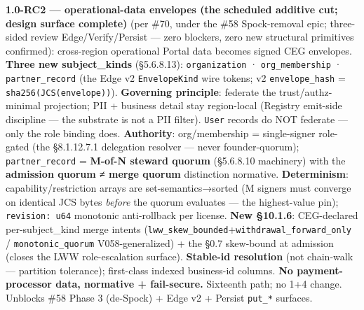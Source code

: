 \documentclass[11pt]{article}
\begin{document}
\textbf{1.0-RC2 — operational-data envelopes (the scheduled additive cut; design surface complete)} (per \#70, under the \#58 Spock-removal epic; three-sided review Edge/Verify/Persist — zero blockers, zero new structural primitives confirmed): cross-region operational Portal data becomes signed CEG envelopes. \textbf{Three new subject\_kinds} (§5.6.8.13): \texttt{organization} · \texttt{org\_membership} · \texttt{partner\_record} (the Edge v2 \texttt{EnvelopeKind} wire tokens; v2 \texttt{envelope\_hash} = \texttt{sha256(JCS(envelope))}). \textbf{Governing principle}: federate the trust/authz-minimal projection; PII + business detail stay region-local (Registry emit-side discipline — the substrate is not a PII filter). \texttt{User} records do NOT federate — only the role binding does. \textbf{Authority}: org/membership = single-signer role-gated (the §8.1.12.7.1 delegation resolver — never founder-quorum); \texttt{partner\_record} = \textbf{M-of-N steward quorum} (§5.6.8.10 machinery) with the \textbf{admission quorum ≠ merge quorum} distinction normative. \textbf{Determinism}: capability/restriction arrays are set-semantics→sorted (M signers must converge on identical JCS bytes \textit{before} the quorum evaluates — the highest-value pin); \texttt{revision: u64} monotonic anti-rollback per license. \textbf{New §10.1.6}: CEG-declared per-subject\_kind merge intents (\texttt{lww\_skew\_bounded}+\texttt{withdrawal\_forward\_only} / \texttt{monotonic\_quorum} V058-generalized) + the §0.7 skew-bound at admission (closes the LWW role-escalation surface). \textbf{Stable-id resolution} (not chain-walk — partition tolerance); first-class indexed business-id columns. \textbf{No payment-processor data, normative + fail-secure.} Sixteenth path; no 1+4 change. Unblocks \#58 Phase 3 (de-Spock) + Edge v2 + Persist \texttt{put\_*} surfaces.
\end{document}

